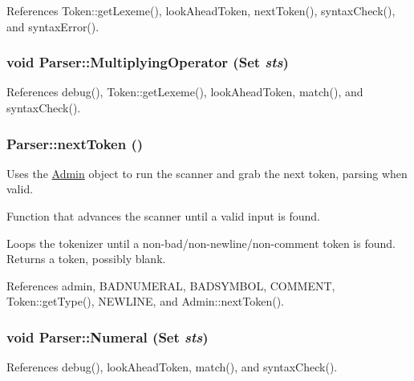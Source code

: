 References Token::getLexeme(), lookAheadToken, nextToken(), syntaxCheck(), and syntaxError().

\hypertarget{classParser_a0f016865b3ae30a62a06abbb7fca7345}{
\subsubsection[{MultiplyingOperator}]{\setlength{\rightskip}{0pt plus 5cm}void Parser::MultiplyingOperator ({\bf Set} {\em sts})}}
\label{classParser_a0f016865b3ae30a62a06abbb7fca7345}


References debug(), Token::getLexeme(), lookAheadToken, match(), and syntaxCheck().

\hypertarget{classParser_ab53c98f6ae7ca5a9a48a1eec75fb52bc}{
\subsubsection[{nextToken}]{ Parser::nextToken ()}}
\label{classParser_ab53c98f6ae7ca5a9a48a1eec75fb52bc}


Uses the \hyperlink{classAdmin}{Admin} object to run the scanner and grab the next token, parsing when valid. 

Function that advances the scanner until a valid input is found.

Loops the tokenizer until a non-\/bad/non-\/newline/non-\/comment token is found. Returns a token, possibly blank. 

References admin, BADNUMERAL, BADSYMBOL, COMMENT, Token::getType(), NEWLINE, and Admin::nextToken().

\hypertarget{classParser_aadadd3280fa339b1433a8ad665479bc4}{
\subsubsection[{Numeral}]{\setlength{\rightskip}{0pt plus 5cm}void Parser::Numeral ({\bf Set} {\em sts})}}
\label{classParser_aadadd3280fa339b1433a8ad665479bc4}


References debug(), lookAheadToken, match(), and syntaxCheck().

